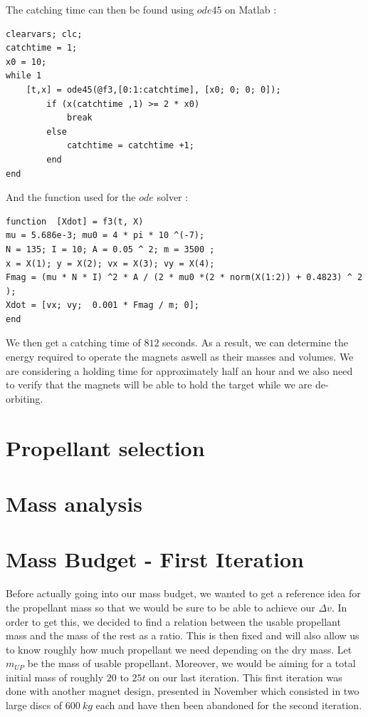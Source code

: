 The catching time can then be found using $ode45$ on Matlab :
\begin{verbatim}
clearvars; clc;
catchtime = 1;
x0 = 10;
while 1
    [t,x] = ode45(@f3,[0:1:catchtime], [x0; 0; 0; 0]);
        if (x(catchtime ,1) >= 2 * x0)
            break
        else
            catchtime = catchtime +1;
        end
end
\end{verbatim}
And the function used for the $ode$ solver :
\begin{verbatim}
function  [Xdot] = f3(t, X)
mu = 5.686e-3; mu0 = 4 * pi * 10 ^(-7);
N = 135; I = 10; A = 0.05 ^ 2; m = 3500 ;
x = X(1); y = X(2); vx = X(3); vy = X(4);
Fmag = (mu * N * I) ^2 * A / (2 * mu0 *(2 * norm(X(1:2)) + 0.4823) ^ 2 );
Xdot = [vx; vy;  0.001 * Fmag / m; 0]; 
end
\end{verbatim}
We then get a catching time of $812$ seconds. As a result, we can determine the energy required to operate the magnets aswell as their masses and volumes. We are considering a holding time for approximately half an hour and we also need to verify that the magnets will be able to hold the target while we are de-orbiting.

\newpage
\section{Propellant selection}
\newpage
\section{Mass analysis}
\newpage
\hypertarget{header-n0}{%
	\section{Mass Budget - First Iteration}\label{header-n0}}

\qquad Before actually going into our mass budget, we wanted to get a reference
idea for the propellant mass so that we would be sure to be able to
achieve our \(\Delta v\). In order to get this, we decided to find a
relation between the usable propellant mass and the mass of the rest as
a ratio. This is then fixed and will also allow us to know roughly how
much propellant we need depending on the dry mass. Let \(m_{UP}\) be the
mass of usable propellant. Moreover, we would be aiming for a total initial mass of roughly $20$ to $25t$ on our last iteration. This first iteration was done with another magnet design, presented in November which consisted in two large discs of $600\ kg$ each and have then been abandoned for the second iteration.

